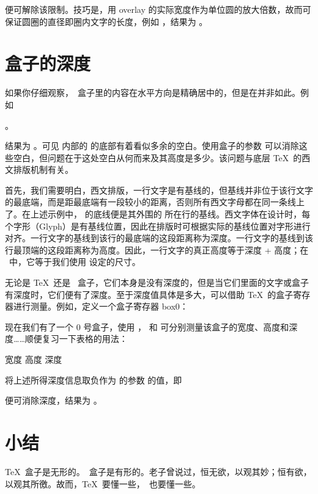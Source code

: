 \noindent 便可解除该限制。技巧是，用 overlay 的实际宽度作为单位圆的放大倍数，故而可保证圆圈的直径即圈内文字的长度，例如 ，结果为 。

\section{盒子的深度}

如果你仔细观察，\ConTeXt\ 盒子里的内容在水平方向是精确居中的，但是在并非如此。例如

\starttyping[option=TEX]
。
\stoptyping

\noindent 结果为 。可见 \type{\inframed} 内部的 \type{\framed} 的底部有着看似多余的空白。使用盒子的参数  可以消除这些空白，但问题在于这处空白从何而来及其高度是多少。该问题与底层 \TeX\ 的西文排版机制有关。

首先，我们需要明白，西文排版，一行文字是有基线的，但基线并非位于该行文字的最底端，而是距最底端有一段较小的距离，否则所有西文字母都在同一条线上了。在上述示例中，\type{\framed} 的底线便是其外围的 \type{\inframed} 所在行的基线。西文字体在设计时，每个字形（Glyph）是有基线位置，因此在排版时可根据实际的基线位置对字形进行对齐。一行文字的基线到该行的最底端的这段距离称为深度。一行文字的基线到该行最顶端的这段距离称为高度。因此，一行文字的真正高度等于深度 + 高度；在 \ConTeXt\ 中，它等于我们使用 \type{\setupinterlinespace} 设定的尺寸。

无论是 \TeX\ 还是 \ConTeXt\ 盒子，它们本身是没有深度的，但是当它们里面的文字或盒子有深度时，它们便有了深度。至于深度值具体是多大，可以借助 \TeX\ 的盒子寄存器进行测量。例如，定义一个盒子寄存器 box0：

\starttyping[option=TEX]
\hbox{}
\stoptyping
{}\hbox{}

\noindent 现在我们有了一个 0 号盒子，使用 \type{\wd}，\type{\ht} 和 \type{\dp} 可分别测量该盒子的宽度、高度和深度……顺便复习一下表格的用法：

\startsample
\starttabulate[|c|c|c|]
\HL
\NC 宽度 \NC 高度 \NC 深度 \NC\NR
\HL
\NC \the{} \NC \the{} \NC \the{} \NC\NR
\HL
\stoptabulate
\stopsample
\simplesample[option=TEX]{\getsample}

将上述所得深度信息取负作为 \type{\inframed} 的参数  的值，即

\starttyping[option=TEX]
\stoptyping

\noindent 便可消除深度，结果为 。

\section{小结}

\TeX\ 盒子是无形的。\ConTeXt\ 盒子是有形的。老子曾说过，恒无欲，以观其妙；恒有欲，以观其所徼。故而，\TeX\ 要懂一些，\ConTeXt\ 也要懂一些。
